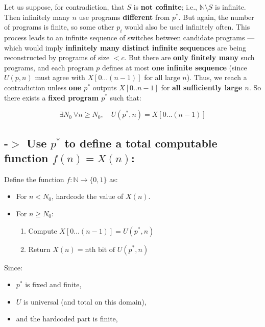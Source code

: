 \documentclass[12pt]{article}
\begin{document}
Let us suppose, for contradiction, that \( S \) is \textbf{not cofinite}; i.e., \( \mathbb{N} \setminus S \)  is infinite.
\newline
\newline
Then infinitely many \( n \) use programs \textbf{different} from \( p^* \). But again, the number of programs is finite, so some other \( p_i \) would also be used infinitely often.
\newline
\newline
This process leads to an infinite sequence of switches between candidate programs — which would imply \textbf{infinitely many distinct infinite sequences} are being reconstructed by programs of size \( < c \).
\newline
\newline
But there are \textbf{only finitely many} such programs, and each program \( p \) defines at most \textbf{one infinite sequence} (since \( U(p, n) \) must agree with \( X[0\ldots(n-1)] \) for all large \( n \)).
\newline
Thus, we reach a contradiction unless \textbf{one \( p^* \)} outputs \( X[0..n-1] \) for \textbf{all sufficiently large \( n \)}.
\newline
\newline
So there exists a \textbf{fixed program \( p^* \)} such that:

\[
\exists N_0\ \forall n \geq N_0,\quad U(p^*, n) = X[0\ldots(n-1)]
\]

\subsection*{-$>$ Use \( p^* \) to define a total computable function \( f(n) = X(n) \):}

Define the function \( f: \mathbb{N} \to \{0,1\} \) as:

\begin{itemize}
  \item For \( n < N_0 \), hardcode the value of \( X(n) \).
  \item For \( n \geq N_0 \):  
  \begin{enumerate}
    \item Compute \( X[0\ldots(n-1)] = U(p^*, n) \)
    \item Return \( X(n) = \text{nth bit of } U(p^*, n) \)
  \end{enumerate}
\end{itemize}

Since:
\begin{itemize}
  \item \( p^* \) is fixed and finite,
  \item \( U \) is universal (and total on this domain),
  \item and the hardcoded part is finite,
\end{itemize}
\end{document}
